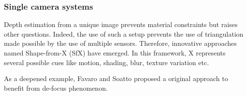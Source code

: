 \subsubsection{Single camera systems}\label{scs}

Depth estimation from a unique image prevents material constraints but raises other questions. Indeed, the use of such a setup prevents the use of triangulation made possible by the use of multiple sensors.
Therefore, innovative approaches named Shape-from-X (SfX) have emerged. In this framework, X represents several possible cues like motion\cite{caine1993design,dellaert2000structure,chhatkuli2014non,parashar2016isometric}, shading\cite{horn1986variational,zhang1999shape}, blur\cite{favaro2005geometric,zhuo2009recovery}, texture variation \cite{aloimonos1988shape} etc.

As a deepened example, Favaro and Soatto \cite{favaro2005geometric} proposed a original approach to benefit from de-focus phenomenon. 

